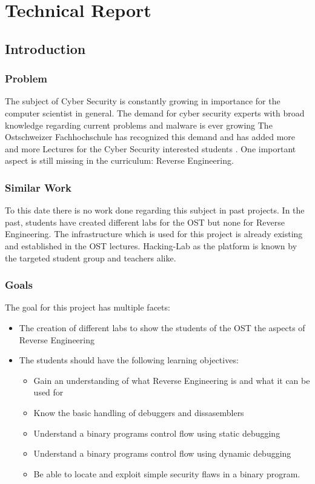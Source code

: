 \chapter{Technical Report}
\section{Introduction}
\subsection{Problem}
The subject of Cyber Security is constantly growing in importance for the computer scientist in general. The demand for cyber security experts with broad knowledge regarding current problems and malware is ever growing \cite{cybercrime-mag} The Ostschweizer Fachhochschule has recognized this demand and has added more and more Lectures for the Cyber Security interested students \cite{ost-cybersec}. One important aspect is still missing in the curriculum: Reverse Engineering.

\subsection{Similar Work}
To this date there is no work done regarding this subject in past projects. In the past, students have created different labs for the OST but none for Reverse Engineering. The infrastructure which is used for this project is already existing and established in the OST lectures. Hacking-Lab as the platform is known by the targeted student group and teachers alike. 

\subsection{Goals}
The goal for this project has multiple facets:
\begin{itemize}
    \item The creation of different labs to show the students of the OST the aspects of Reverse Engineering
    \item The students should have the following learning objectives:
    \begin{itemize}
        \item Gain an understanding of what Reverse Engineering is and what it can be used for
        \item Know the basic handling of debuggers and dissasemblers
        \item Understand a binary programs control flow using static debugging
        \item Understand a binary programs control flow using dynamic debugging
        \item Be able to locate and exploit simple security flaws in a binary program.
    \end{itemize}
\end{itemize}

